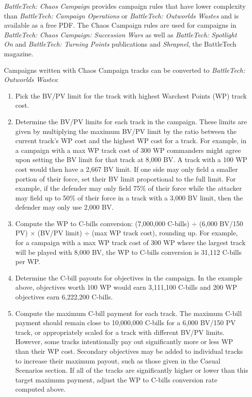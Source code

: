 \emph{BattleTech: Chaos Campaign} provides campaign rules that have lower complexity than \emph{BattleTech: Campaign Operations} or \emph{BattleTech: Outworlds Wastes} and is available as a free PDF.
The Chaos Campaign rules are used for campaigns in \emph{BattleTech: Chaos Campaign: Succession Wars} as well as \emph{BattleTech: Spotlight On} and \emph{BattleTech: Turning Points} publications and \emph{Shrapnel}, the BattleTech magazine.

Campaigns written with Chaos Campaign tracks can be converted to \emph{BattleTech: Outworlds Wastes}:

\begin{enumerate}

\item Pick the BV/PV limit for the track with highest Warchest Points (WP) track cost.

\item Determine the BV/PV limits for each track in the campaign.
These limits are given by multiplying the maximum BV/PV limit by the ratio between the current track's WP cost and the highest WP cost for a track.
For example, in a campaign with a max WP track cost of 300 WP commanders might agree upon setting the BV limit for that track at 8,000 BV.
A track with a 100 WP cost would then have a 2,667 BV limit.
If one side may only field a smaller portion of their force, set their BV limit proportional to the full limit.
For example, if the defender may only field 75\% of their force while the attacker may field up to 50\% of their force in a track with a 3,000 BV limit, then the defender may only use 2,000 BV.

\item Compute the WP to C-bills conversion: (7,000,000 C-bills) $\div$ (6,000 BV/150 PV) $\times$ (BV/PV limit) $\div$ (max WP track cost), rounding up.
For example, for a campaign with a max WP track cost of 300 WP where the largest track will be played with 8,000 BV, the WP to C-bills conversion is 31,112 C-bills per WP.
\item Determine the C-bill payouts for objectives in the campaign.
In the example above, objectives worth 100 WP would earn 3,111,100 C-bills and 200 WP objectives earn 6,222,200 C-bills.

\item Compute the maximum C-bill payment for each track.
The maximum C-bill payment should remain close to 10,000,000 C-bills for a 6,000 BV/150 PV track, or appropriately scaled for a track with different BV/PV limits.
However, some tracks intentionally pay out significantly more or less WP than their WP cost.
Secondary objectives may be added to individual tracks to increase their maximum payout, such as those given in the Casual Scenarios section.
If all of the tracks are significantly higher or lower than this target maximum payment, adjust the WP to C-bills conversion rate computed above.


\end{enumerate}
